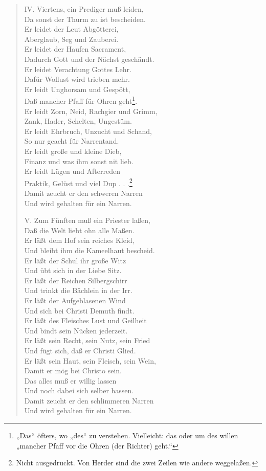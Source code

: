 \begin{verse}
IV. Viertens, ein Prediger muß leiden,\\
Da sonst der Thurm zu ist bescheiden.\\
Er leidet der Leut Abgötterei,\\
Aberglaub, Seg und Zauberei.\\
Er leidet der Haufen Sacrament,\\
Dadurch Gott und der Nächst geschändt.\\
Er leidet Verachtung Gottes Lehr.\\
Dafür Wollust wird trieben mehr.\\
Er leidt Unghorsam und Gespött,\\
Daß mancher Pfaff für Ohren geht\footnote{„Das“ öfters, wo „des“ zu verstehen. Vielleicht: das oder um des willen „mancher Pfaff vor die Ohren (der Richter) geht.“}.\\
Er leidt Zorn, Neid, Rachgier und Grimm,\\
Zank, Hader, Schelten, Ungestüm.\\
Er leidt Ehrbruch, Unzucht und Schand,\\
So nur geacht für Narrentand.\\
Er leidt große und kleine Dieb,\\
Finanz und was ihm sonst nit lieb.\\
Er leidt Lügen und Afterreden\\
Praktik, Gelüst und viel Dup . . .\footnote{Nicht ausgedruckt. Von Herder sind die zwei Zeilen wie andere weggelaßen.}\\
Damit zeucht er den schweren Narren\\
Und wird gehalten für ein Narren.

V. Zum Fünften muß ein Priester laßen,\\
Daß die Welt liebt ohn alle Maßen.\\
Er läßt dem Hof sein reiches Kleid,\\
Und bleibt ihm die Kameelhaut bescheid.\\
Er läßt der Schul ihr große Witz\\
Und übt sich in der Liebe Sitz.\\
Er läßt der Reichen Silbergschirr\\
Und trinkt die Bächlein in der Irr.\\
Er läßt der Aufgeblasenen Wind\\
Und sich bei Christi Demuth findt.\\
Er läßt des Fleisches Lust und Geilheit\\
Und bindt sein Nücken jederzeit.\\
Er läßt sein Recht, sein Nutz, sein Fried\\
Und fügt sich, daß er Christi Glied.\\
Er läßt sein Haut, sein Fleisch, sein Wein,\\
Damit er mög bei Christo sein.\\
Das alles muß er willig lassen\\
Und noch dabei sich selber hassen.\\
Damit zeucht er den schlimmeren Narren\\
Und wird gehalten für ein Narren.


\end{verse}
